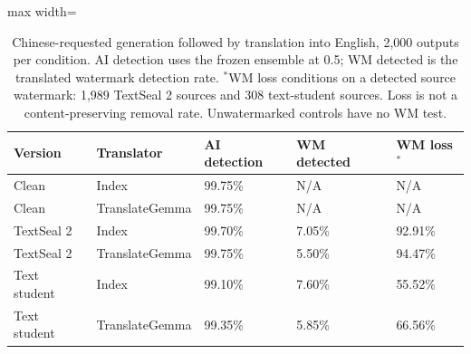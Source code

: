 \begin{table}[ht]\centering\small
\begin{adjustbox}{max width=\linewidth}
\begin{tabular}{lllll}\toprule
Version & Translator & AI detection & WM detected & WM loss$^*$\\\midrule
Clean & Index & 99.75\% & N/A & N/A\\
Clean & TranslateGemma & 99.75\% & N/A & N/A\\
TextSeal 2 & Index & 99.70\% & 7.05\% & 92.91\%\\
TextSeal 2 & TranslateGemma & 99.75\% & 5.50\% & 94.47\%\\
Text student & Index & 99.10\% & 7.60\% & 55.52\%\\
Text student & TranslateGemma & 99.35\% & 5.85\% & 66.56\%\\
\bottomrule\end{tabular}\end{adjustbox}
\caption{Chinese-requested generation followed by translation into English, 2,000 outputs per condition. AI detection uses the frozen ensemble at 0.5; WM detected is the translated watermark detection rate. $^*$WM loss conditions on a detected source watermark: 1,989 TextSeal 2 sources and 308 text-student sources. Loss is not a content-preserving removal rate. Unwatermarked controls have no WM test.}\label{tab:translation_chinese}\end{table}
